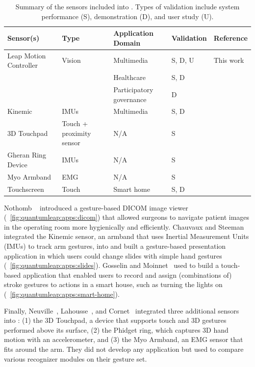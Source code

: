\begin{table}[!b]
    \renewcommand{\arraystretch}{1.2}
    \footnotesize
    \centering
    \begin{tabular}{l>{\raggedright}p{2.5cm}>{\raggedright}p{1.75cm}ll}
        \toprule    
        \textbf{Sensor(s)} & \textbf{Type} & \textbf{Application Domain} & \textbf{Validation} & \textbf{Reference} \\
        \midrule
        Leap Motion Controller & Vision & Multimedia & S, D, U & This work \\
         &  & Healthcare & S, D & \cite{Nothomb:2020} \\
         &  & Participatory governance & D & \cite{Rawart:2023} \\
        Kinemic & IMUs & Multimedia & S, D & \cite{Steeman:2022} \\
        3D Touchpad & Touch + proximity sensor & N/A & S & \cite{Neuville:2021} \\
        Gheran Ring Device & IMUs & N/A & S & \cite{Lahousse:2022} \\
        Myo Armband & EMG & N/A & S & \cite{Cornet:2023} \\
        Touchscreen & Touch & Smart home & S, D & \cite{Moinnet:2022} \\
        \bottomrule
    \end{tabular}
    \caption{Summary of the sensors included into \ql. Types of validation include system performance (S), demonstration (D), and user study (U).}
    \label{tab:quantumleap:integration}
\end{table}

Nothomb \etal~\cite{Nothomb:2020} introduced a gesture-based DICOM image viewer (\fig~\ref{fig:quantumleap:apps:dicom}) that allowed surgeons to navigate patient images in the operating room more hygienically and efficiently.
%
Chauvaux and Steeman~\cite{Steeman:2022} integrated the Kinemic sensor, an armband that uses Inertial Measurement Units (IMUs) to track arm gestures, into \ql and built a gesture-based presentation application in which users could change slides with simple hand gestures (\fig~\ref{fig:quantumleap:apps:slides}).
%
Gosselin and Moinnet~\cite{Moinnet:2022} used \ql to build a touch-based application that enabled users to record and assign (combinations of) stroke gestures to actions in a smart house, such as turning the lights on (\fig~\ref{fig:quantumleap:apps:smart-home}).

Finally, Neuville~\cite{Neuville:2021}, Lahousse~\cite{Lahousse:2022}, and Cornet~\cite{Cornet:2023} integrated three additional sensors into \ql: (1) the 3D Touchpad, a device that supports touch and 3D gestures performed above its surface, (2) the Phidget ring, which captures 3D hand motion with an accelerometer, and (3) the Myo Armband, an EMG sensor that fits around the arm. They did not develop any application but used \ql to compare various recognizer modules on their gesture set.

